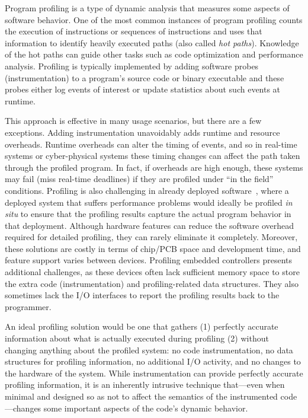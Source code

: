 Program profiling is a type of dynamic analysis that measures some aspects of software behavior. One of the most common instances of program profiling counts the execution of instructions or sequences of instructions and uses that information to identify heavily executed paths (also called \textit{hot paths}). Knowledge of the hot paths can guide other tasks such as code optimization and performance analysis. Profiling is typically implemented by adding software probes (instrumentation) to a program's source code or binary executable and these probes either log events of interest or update statistics about such events at runtime.

This approach is effective in many usage scenarios, but there are a few exceptions. Adding instrumentation unavoidably adds runtime and resource overheads. Runtime overheads can alter the timing of events, and so in real-time systems or cyber-physical systems these timing changes can affect the path taken through the profiled program.  In fact, if overheads are high enough, these systems may fail (\eg miss real-time deadlines) if they are profiled under ``in the field'' conditions. Profiling is also challenging in already deployed software~\cite{kraft2010}, where a deployed system that suffers performance problems would ideally be profiled \textit{in situ} to ensure that the profiling results capture the actual program behavior in that deployment. Although hardware features can reduce the software overhead required for detailed profiling, they can rarely eliminate it completely. Moreover, these solutions are costly in terms of chip/PCB space and development time, and feature support varies between devices.  Profiling embedded controllers presents additional challenges, as these devices often lack sufficient memory space to store the extra code (instrumentation) and profiling-related data structures. They also sometimes lack the I/O interfaces to report the profiling results back to the programmer.

An ideal profiling solution would be one that gathers (1) perfectly accurate information about what is actually executed during profiling (2) without changing anything about the profiled system: no code instrumentation, no data structures for profiling information, no additional I/O activity, and no changes to the hardware of the system. While instrumentation can provide perfectly accurate profiling information, it is an inherently intrusive technique that---even when minimal and designed so as not to affect the semantics of the instrumented code---changes some important aspects of the code's dynamic behavior.

